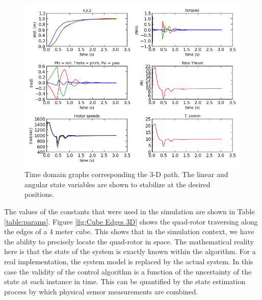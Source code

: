 \begin{figure}[htbp]
	\centering
		\includegraphics[scale = 0.5]{Figures/typical_run_time_domain.png}
	\caption[Typical Run Time Domain]{Time domain graphs corresponding the 3-D path. The linear and angular state variables are shown to stabilize at the desired positions. }
	\label{fig:Typical Run Time Domain}
\end{figure}
The values of the constants that were used in the simulation are shown in Table \ref{table:params}. Figure \ref{fig:Cube Edges 3D} shows the quad-rotor traversing along the edges of a 4 meter cube. This shows that in the simulation context, we have the ability to precisely locate the quad-rotor in space. The mathematical reality here is that the state of the system is exactly known within the algorithm. For a real implementation, the system model is replaced by the actual system. In this case the validity of the control algorithm is a function of the uncertainty of the state at each instance in time. This can be quantified by the state estimation process by which physical sensor measurements are combined.
